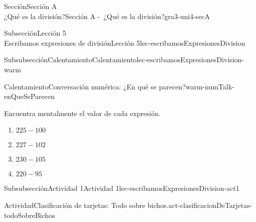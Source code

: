 \begin{sectionptx}{Sección}{{\Large Sección A\\}¿Qué es la división?}{}{Sección A -~¿Qué es la división?}{}{}{gra3-uni4-secA}
\begin{subsectionptx}{Subsección}{{\normalsize Lección 5\\[-0.05cm]}Escribamos expresiones de división}{}{Lección 5}{}{}{lec-escribamosExpresionesDivision}
\typeout{************************************************}
%
\begin{subsubsectionptx}{Subsubsección}{Calentamiento}{}{Calentamiento}{}{}{lec-escribamosExpresionesDivision-warm}
\nobreak
\begin{exploration}{Calentamiento}{Conversación numérica: ¿En qué se parecen?}{warm-numTalk-enQueSeParecen}%
\begin{sidebyside}{2}{0}{0.0}{0.2}%
\begin{sbspanel}{0.4}%
Encuentra mentalmente el valor de cada expresión.%
\end{sbspanel}%
\begin{sbspanel}{0.3}%
%
\vspace{-1ex}
\begin{enumerate}[label={\Alph*.}]
\item{}\(\displaystyle 225 - 100\)%
\item{}\(\displaystyle 227 - 102\)%
\item{}\(\displaystyle 230 - 105\)%
\item{}\(\displaystyle 220 - 95\)%
\end{enumerate}
\vspace{-0.5ex}
%
\end{sbspanel}%
\end{sidebyside}
\end{exploration}%
\end{subsubsectionptx}
%
%
\typeout{************************************************}
\typeout{************************************************}
%
\begin{subsubsectionptx}{Subsubsección}{Actividad 1}{}{Actividad 1}{}{}{lec-escribamosExpresionesDivision-act1}
\begin{activity}{Actividad}{Clasificación de tarjetas: Todo sobre bichos.}{act-clasificacionDeTarjetas-todoSobreBichos}%

\end{activity}
\end{subsubsectionptx}
\end{subsectionptx}
\end{sectionptx}
